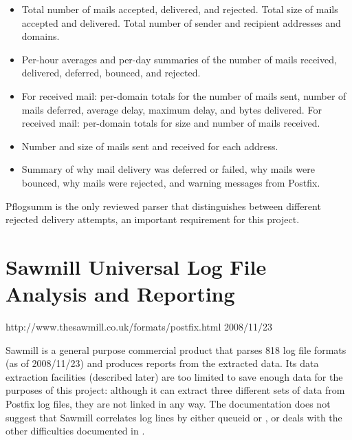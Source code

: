 \begin{itemize}

    \item Total number of mails accepted, delivered, and rejected.  Total
        size of mails accepted and delivered.  Total number of sender and
        recipient addresses and domains.

    \item Per-hour averages and per-day summaries of the number of mails
        received, delivered, deferred, bounced, and rejected.

    \item For received mail: per-domain totals for the number of mails
        sent, number of mails deferred, average delay, maximum delay, and
        bytes delivered.  For received mail: per-domain totals for size and
        number of mails received.

    \item Number and size of mails sent and received for each address.

    \item Summary of why mail delivery was deferred or failed, why mails
        were bounced, why mails were rejected, and warning messages from
        Postfix.

\end{itemize}

Pflogsumm is the only reviewed parser that distinguishes between different
rejected delivery attempts, an important requirement for this project.

\section{Sawmill Universal Log File Analysis and Reporting}

{http://www.thesawmill.co.uk/formats/postfix.html}
{2008/11/23}

Sawmill is a general purpose commercial product that parses 818 log file
formats (as of 2008/11/23) and produces reports from the extracted data.
Its data extraction facilities (described later) are too limited to save
enough data for the purposes of this project: although it can extract three
different sets of data from Postfix log files, they are not linked in any
way.  The documentation does not suggest that Sawmill correlates log lines
by either queueid or , or deals with the other difficulties
documented in .


